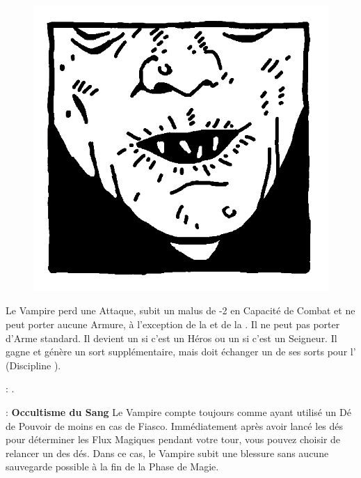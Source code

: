 \begin{figure}
\centering
\includegraphics[width=\logosize]{pics/logo_nosferatu.png}
\end{figure}
Le Vampire perd une Attaque, subit un malus de -2 en Capacité de Combat et ne peut porter aucune Armure, à l'exception de la \mountsprotection{} et de la \innatedefence{}. Il ne peut pas porter d'Arme standard. Il devient un  si c'est un Héros ou un  si c'est un Seigneur. Il gagne \awaken{\skeletons{}, \zombies{}} et génère un sort supplémentaire, mais doit échanger un de ses sorts pour l'\necromancysignaturespell{} (Discipline \necromancy{}).

\vspace{0.5cm}
\bloodties{} : \textbf{\wraiths{}}.

\vspace{0.5cm}
\ancientbloodpower{} : \textbf{Occultisme du Sang}\dotfill{}\newline%
Le Vampire compte toujours comme ayant utilisé un Dé de Pouvoir de moins en cas de Fiasco. Immédiatement après avoir lancé les dés pour déterminer les Flux Magiques pendant votre tour, vous pouvez choisir de relancer un des dés. Dans ce cas, le Vampire subit une blessure sans aucune sauvegarde possible à la fin de la Phase de Magie.

\closearmynewsection

